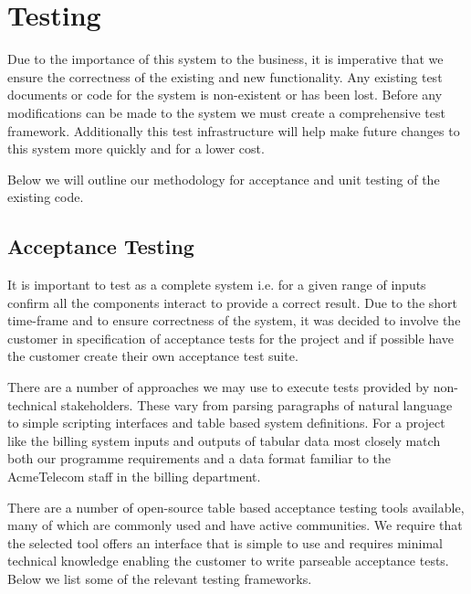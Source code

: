 \section{Testing}
Due to the importance of this system to the business, it is imperative that we ensure the correctness of the existing and new functionality. Any existing test documents or code for the system is non-existent or has been lost. Before any modifications can be made to the system we must create a comprehensive test framework. Additionally this test infrastructure will help make future changes to this system more quickly and for a lower cost.

Below we will outline our methodology for acceptance and unit testing of the existing code.

\subsection*{Acceptance Testing}
It is important to test as a complete system i.e. for a given range of inputs confirm all the components interact to provide a correct result. Due to the short time-frame and to ensure correctness of the system, it was decided to involve the customer in specification of acceptance tests for the project and if possible have the customer create their own acceptance test suite. 

There are a number of approaches we may use to execute tests provided by non-technical stakeholders. These vary from parsing paragraphs of natural language to simple scripting interfaces and table based system definitions. For a project like the billing system inputs and outputs of tabular data most closely match both our programme requirements and a data format familiar to the AcmeTelecom staff in the billing department.

There are a number of open-source table based acceptance testing tools available, many of which are commonly used and have active communities. We require that the selected tool offers an interface that is simple to use and requires minimal technical knowledge enabling the customer to write parseable acceptance tests. Below we list some of the relevant testing frameworks.


